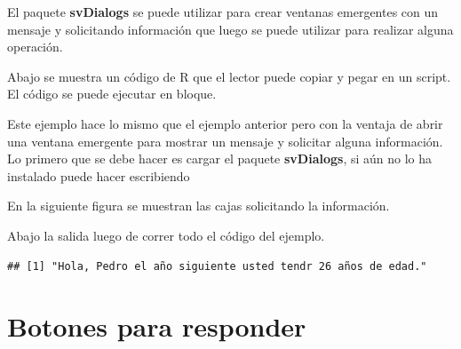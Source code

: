 \documentclass[
]{book}
\makeatletter
\newenvironment{Shaded}{\begin{snugshade}}{\end{snugshade}}
\newcommand{\AttributeTok}[1]{\textcolor[rgb]{0.77,0.63,0.00}{#1}}
\newcommand{\CommentTok}[1]{\textcolor[rgb]{0.56,0.35,0.01}{\textit{#1}}}
\newcommand{\DecValTok}[1]{\textcolor[rgb]{0.00,0.00,0.81}{#1}}
\newcommand{\FunctionTok}[1]{\textcolor[rgb]{0.00,0.00,0.00}{#1}}
\newcommand{\NormalTok}[1]{#1}
\newcommand{\OtherTok}[1]{\textcolor[rgb]{0.56,0.35,0.01}{#1}}
\newcommand{\SpecialCharTok}[1]{\textcolor[rgb]{0.00,0.00,0.00}{#1}}
\newcommand{\StringTok}[1]{\textcolor[rgb]{0.31,0.60,0.02}{#1}}
\newenvironment{kframe}{%
\medskip{}
\setlength{\fboxsep}{.8em}
 \def\at@end@of@kframe{}%
 \ifinner\ifhmode%
  \def\at@end@of@kframe{\end{minipage}}%
  \begin{minipage}{\columnwidth}%
 \fi\fi%
 \def\FrameCommand##1{\hskip\@totalleftmargin \hskip-\fboxsep
 \colorbox{shadecolor}{##1}\hskip-\fboxsep
     \hskip-\linewidth \hskip-\@totalleftmargin \hskip\columnwidth}%
 \MakeFramed {\advance\hsize-\width
   \@totalleftmargin\z@ \linewidth\hsize
   \@setminipage}}%
 {\par\unskip\endMakeFramed%
 \at@end@of@kframe}
\renewenvironment{Shaded}{\begin{kframe}}{\end{kframe}}
\makeatother
\begin{document}
El paquete \textbf{svDialogs} se puede utilizar para crear ventanas emergentes con un mensaje y solicitando información que luego se puede utilizar para realizar alguna operación.

Abajo se muestra un código de R que el lector puede copiar y pegar en un script. El código se puede ejecutar en bloque.

Este ejemplo hace lo mismo que el ejemplo anterior pero con la ventaja de abrir una ventana emergente para mostrar un mensaje y solicitar alguna información. Lo primero que se debe hacer es cargar el paquete \textbf{svDialogs}, si aún no lo ha instalado puede hacer escribiendo

\begin{Shaded}
\end{Shaded}

En la siguiente figura se muestran las cajas solicitando la información.

Abajo la salida luego de correr todo el código del ejemplo.

\begin{verbatim}
## [1] "Hola, Pedro el año siguiente usted tendr 26 años de edad."
\end{verbatim}

\hypertarget{botones-para-responder}{%
\section{Botones para responder}\label{botones-para-responder}}
\end{document}
